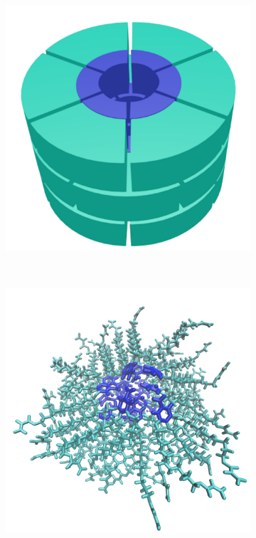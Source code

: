 \documentclass[journal=jpcbfk,manuscript=article]{achemso}
\begin{document}
  \begin{figure}[!htb]
  \centering
	\begin{subfigure}{0.45\linewidth}
		\centering
		\includegraphics[width=\textwidth]{cartoon_pore.pdf}
		\caption{}~\label{fig:undetailed_pore}
	\end{subfigure}
	\begin{subfigure}{0.45\linewidth}
		\centering
		\includegraphics[width=\textwidth]{detailed_pore.pdf}

\end{subfigure}
\end{figure}
\end{document}
